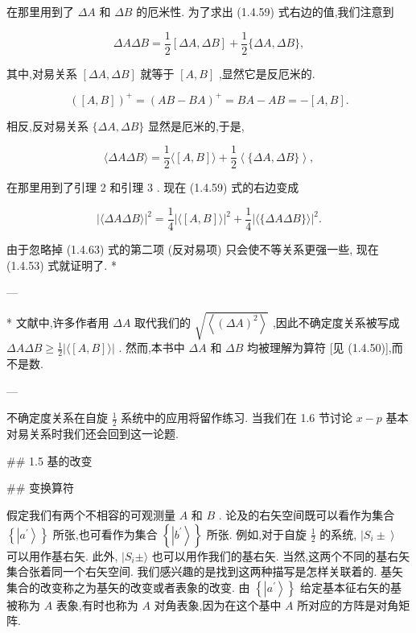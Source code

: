 \documentclass[lang=cn,newtx,10pt,scheme=chinese,thmcnt=section]{elegantbook}
\begin{document}
在那里用到了 ${\Delta A}$ 和 ${\Delta B}$ 的厄米性. 为了求出 (1.4.59) 式右边的值,我们注意到

$$
{\Delta A\Delta B} = \frac{1}{2}\left\lbrack {{\Delta A},{\Delta B}}\right\rbrack + \frac{1}{2}\{ {\Delta A},{\Delta B}\} , \tag{1. 4.60}
$$

其中,对易关系 $\left\lbrack {{\Delta A},{\Delta B}}\right\rbrack$ 就等于 $\left\lbrack {A, B}\right\rbrack$ ,显然它是反厄米的.

$$
{\left( \left\lbrack A, B\right\rbrack \right) }^{ + } = {\left( AB - BA\right) }^{ + } = {BA} - {AB} = - \left\lbrack {A, B}\right\rbrack . \tag{1. 4.61}
$$

相反,反对易关系 $\{ {\Delta A},{\Delta B}\}$ 显然是厄米的,于是,

$$
\langle {\Delta A\Delta B}\rangle = \frac{1}{2}\langle \left\lbrack {A, B}\right\rbrack \rangle + \frac{1}{2}\left\langle {\{ {\Delta A},{\Delta B}\} }\right\rangle , \tag{1. 4.62}
$$

在那里用到了引理 2 和引理 3 . 现在 (1.4.59) 式的右边变成

$$
{\left| \langle \Delta A\Delta B\rangle \right| }^{2} = \frac{1}{4}{\left| \langle \left\lbrack A, B\right\rbrack \rangle \right| }^{2} + \frac{1}{4}{\left| \langle \{ \Delta A\Delta B\} \rangle \right| }^{2}. \tag{1. 4.63}
$$

由于忽略掉 (1.4.63) 式的第二项 (反对易项) 只会使不等关系更强一些, 现在 (1.4.53) 式就证明了. *

---

* 文献中,许多作者用 ${\Delta A}$ 取代我们的 $\sqrt{\left\langle {\left( \Delta A\right) }^{2}\right\rangle }$ ,因此不确定度关系被写成 ${\Delta A\Delta B} \geq \frac{1}{2}\left| {\langle \left\lbrack {A, B}\right\rbrack \rangle }\right|$ . 然而,本书中 ${\Delta A}$ 和 ${\Delta B}$ 均被理解为算符 [见 (1.4.50)],而不是数.

---

不确定度关系在自旋 $\frac{1}{2}$ 系统中的应用将留作练习. 当我们在 1.6 节讨论 $x - p$ 基本对易关系时我们还会回到这一论题.



## 1.5 基的改变

## 变换算符

假定我们有两个不相容的可观测量 $A$ 和 $B$ . 论及的右矢空间既可以看作为集合 $\left\{ \left| {a}^{\prime }\right\rangle \right\}$ 所张,也可看作为集合 $\left\{ \left| {b}^{\prime }\right\rangle \right\}$ 所张. 例如,对于自旋 $\frac{1}{2}$ 的系统, $\left| {{S}_{i} \pm }\right\rangle$ 可以用作基右矢. 此外, $\mid {S}_{i} \pm \rangle$ 也可以用作我们的基右矢. 当然,这两个不同的基右矢集合张着同一个右矢空间. 我们感兴趣的是找到这两种描写是怎样关联着的. 基矢集合的改变称之为基矢的改变或者表象的改变. 由 $\left\{ \left| {a}^{\prime }\right\rangle \right\}$ 给定基本征右矢的基被称为 $A$ 表象,有时也称为 $A$ 对角表象,因为在这个基中 $A$ 所对应的方阵是对角矩阵.
\end{document}
